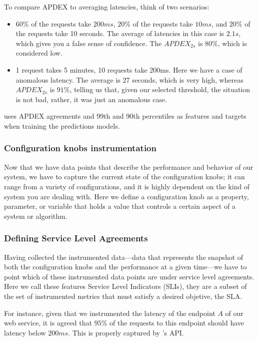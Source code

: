 To compare APDEX to averaging latencies, think of two scenarios:

\begin{itemize}
  \item $60\%$ of the requests take $200ms$, $20\%$ of the requests take $10ms$, and $20\%$ of the requests take 10 seconds. The average of latencies in this case is $2.1s$, which gives you a false sense of confidence. The $APDEX_{2s}$ is $80\%$, which is considered low.
  \item 1 request takes 5 minutes, 10 requests take 200ms. Here we have a case of anomalous latency. The average is 27 seconds, which is very high, whereas $APDEX_{2s}$ is $91\%$, telling us that, given our selected threshold, the situation is not bad, rather, it was just an anomalous case.
  
\end{itemize}

\projectname{} uses APDEX agreements and 99th and 90th percentiles as features and targets when training the predictions models.


\subsubsection{Configuration knobs instrumentation}

Now that we have data points that describe the performance and behavior of our system, we have to capture the current state of the configuration knobs; it can range from a variety of configurations, and it is highly dependent on the kind of system you are dealing with. Here we define a configuration knob as a property, parameter, or variable that holds a value that controls a certain aspect of a system or algorithm.

\subsubsection{Defining Service Level Agreements}

Having collected the instrumented data---data that represents the snapshot of both the configuration knobs and the performance at a given time---we have to point which of these instrumented data points are under service level agreements. Here we call these features Service Level Indicators (SLIs), they are a subset of the set of instrumented metrics that must satisfy a desired objetive, the SLA. 

For instance, given that we instrumented the latency of the endpoint $A$ of our web service, it is agreed that $95\%$ of the requests to this endpoint should have latency below $200ms$. This is properly captured by \projectname{}'s API.

